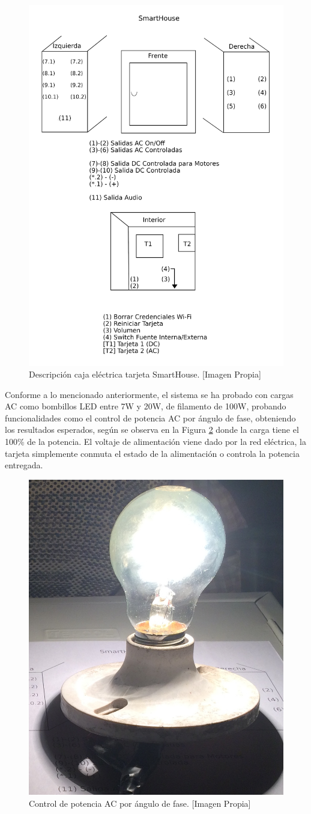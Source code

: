 \begin{figure}
	\centering
	\caption[Descripción caja eléctrica tarjeta SmartHouse.]{Descripción caja eléctrica tarjeta SmartHouse. [Imagen Propia]}
	\label{fig:labels}
	\includegraphics[width=0.7\linewidth]{Imagenes/labels}
\end{figure}

Conforme a lo mencionado anteriormente, el sistema se ha probado con cargas AC como bombillos LED entre 7W y 20W, de filamento de 100W, probando funcionalidades como el control de potencia AC por ángulo de fase, obteniendo los resultados esperados, según se observa en la Figura \ref{fig:ACc} donde la carga tiene el 100\% de la potencia. El voltaje de alimentación viene dado por la red eléctrica, la tarjeta simplemente conmuta el estado de la alimentación o controla la potencia entregada.\\

\begin{figure}[!t]
	\centering
	\caption[Control de potencia AC por ángulo de fase.]{Control de potencia AC por ángulo de fase. [Imagen Propia]}
	\label{fig:ACc}
	\includegraphics[width=0.3\linewidth]{Imagenes/AC1}
\end{figure}

